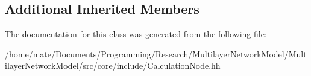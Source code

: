 \subsection*{Additional Inherited Members}


The documentation for this class was generated from the following file\+:\begin{DoxyCompactItemize}
\item 
/home/mate/\+Documents/\+Programming/\+Research/\+Multilayer\+Network\+Model/\+Multilayer\+Network\+Model/src/core/include/Calculation\+Node.\+hh\end{DoxyCompactItemize}

